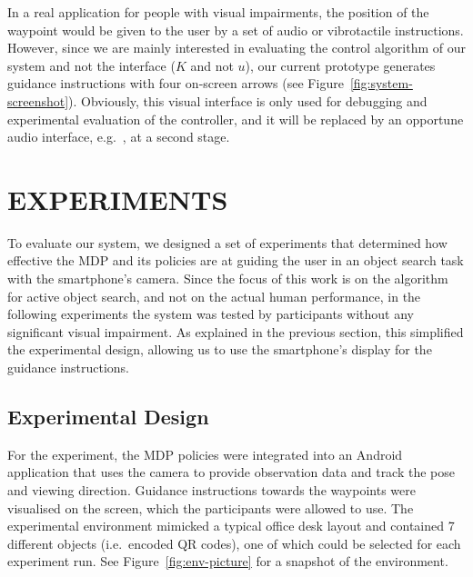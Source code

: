 \documentclass[a4paper, twoside]{article}
\begin{document}
In a real application for people with visual impairments, the position of the waypoint would be given to the user by a set of audio or vibrotactile instructions. However, since we are mainly interested in evaluating the control algorithm of our system and not the interface ($K$ and not $u$), our current prototype generates guidance instructions with four on-screen arrows (see Figure~\ref{fig:system-screenshot}).
Obviously, this visual interface is only used for debugging and experimental evaluation of the controller, and it will be replaced by an opportune audio interface, e.g.~\cite{bellotto2013}, at a second stage.


\section{\uppercase{Experiments}}\label{sec:experiments}

\noindent To evaluate our system, we designed a set of experiments that determined how effective the MDP and its policies are at guiding the user in an object search task with the smartphone's camera. Since the focus of this work is on the algorithm for active object search, and not on the actual human performance, in the following experiments the system was tested by participants without any significant visual impairment. As explained in the previous section, this simplified the experimental design, allowing us to use the smartphone's display for the guidance instructions.

\subsection{Experimental Design}

\noindent For the experiment, the MDP policies were integrated into an Android application that uses the camera to provide observation data and track the pose and viewing direction. Guidance instructions towards the waypoints were visualised on the screen, which the participants were allowed to use. The experimental environment mimicked a typical office desk layout and contained 7 different objects (i.e.\ encoded QR codes), one of which could be selected for each experiment run. See Figure~\ref{fig:env-picture} for a snapshot of the environment. 
\end{document}
